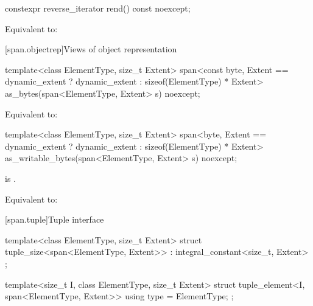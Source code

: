 %
\begin{itemdecl}
constexpr reverse_iterator rend() const noexcept;
\end{itemdecl}

\begin{itemdescr}
\pnum
\effects
Equivalent to: 
\end{itemdescr}


[span.objectrep]{Views of object representation}

%
\begin{itemdecl}
template<class ElementType, size_t Extent>
  span<const byte, Extent == dynamic_extent ? dynamic_extent : sizeof(ElementType) * Extent>
    as_bytes(span<ElementType, Extent> s) noexcept;
\end{itemdecl}

\begin{itemdescr}
\pnum
\effects
Equivalent to: 
\end{itemdescr}

%
\begin{itemdecl}
template<class ElementType, size_t Extent>
  span<byte, Extent == dynamic_extent ? dynamic_extent : sizeof(ElementType) * Extent>
    as_writable_bytes(span<ElementType, Extent> s) noexcept;
\end{itemdecl}

\begin{itemdescr}
\pnum
\constraints
{} is .

\pnum
\effects
Equivalent to: 
\end{itemdescr}

[span.tuple]{Tuple interface}

%
\begin{itemdecl}
template<class ElementType, size_t Extent>
  struct tuple_size<span<ElementType, Extent>>
    : integral_constant<size_t, Extent> { };
\end{itemdecl}

%
\begin{itemdecl}
template<size_t I, class ElementType, size_t Extent>
  struct tuple_element<I, span<ElementType, Extent>> {
    using type = ElementType;
  };
\end{itemdecl}

